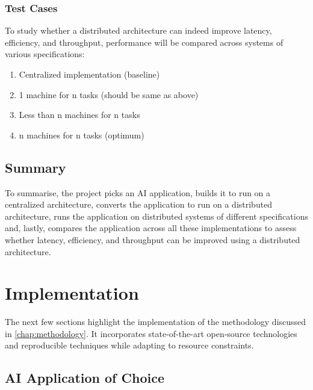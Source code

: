\documentclass{report}
\begin{document}
\subsection{Test Cases}
To study whether a distributed architecture can indeed improve latency, efficiency, and throughput, performance will be compared across systems of various specifications:

\begin{enumerate}
  \item Centralized implementation (baseline)
  \item 1 machine for n tasks (should be same as above)
  \item Less than n machines for n tasks
  \item n machines for n tasks (optimum)
\end{enumerate}

\section{Summary}
To summarise, the project picks an AI application, builds it to run on a centralized architecture, converts the application to run on a distributed architecture, runs the application on distributed systems of different specifications and, lastly, compares the application across all these implementations to assess whether latency, efficiency, and throughput can be improved using a distributed architecture.

\chapter{Implementation}\label{chap:implementation}

The next few sections highlight the implementation of the methodology discussed in \cref{chap:methodology}.
It incorporates state-of-the-art open-source technologies and reproducible techniques while adapting to resource constraints.

\section{AI Application of Choice}
\end{document}
